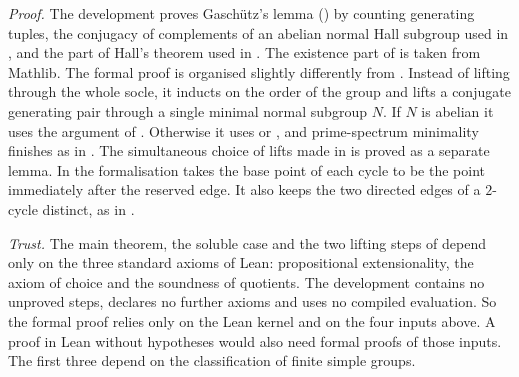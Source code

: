 \documentclass[11pt,colorlinks]{charlie}
\begin{document}
\emph{Proof.} The development proves Gasch\"utz's lemma () by counting generating tuples, the conjugacy of complements of an abelian normal Hall subgroup used in , and the part of Hall's theorem used in . The existence part of  is taken from Mathlib. The formal proof is organised slightly differently from . Instead of lifting through the whole socle, it inducts on the order of the group and lifts a conjugate generating pair through a single minimal normal subgroup $N$. If $N$ is abelian it uses the argument of . Otherwise it uses  or , and prime-spectrum minimality finishes as in . The simultaneous choice of lifts made in  is proved as a separate lemma. In  the formalisation takes the base point of each cycle to be the point immediately after the reserved edge. It also keeps the two directed edges of a $2$-cycle distinct, as in .

\emph{Trust.} The main theorem, the soluble case and the two lifting steps of  depend only on the three standard axioms of Lean: propositional extensionality, the axiom of choice and the soundness of quotients. The development contains no unproved steps, declares no further axioms and uses no compiled evaluation. So the formal proof relies only on the Lean kernel and on the four inputs above. A proof in Lean without hypotheses would also need formal proofs of those inputs. The first three depend on the classification of finite simple groups.
\end{document}
